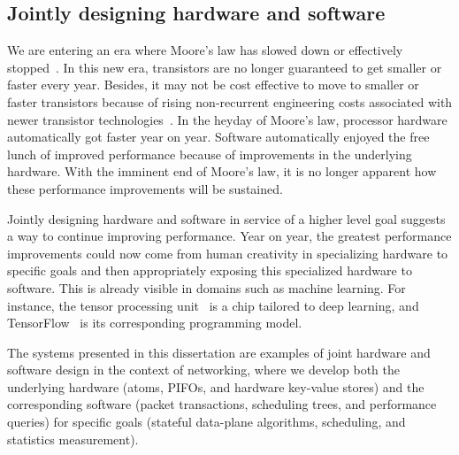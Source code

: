 \subsection{Jointly designing hardware and software} We are entering an era
where Moore's law has slowed down or effectively stopped~\cite{dark_silicon,
four_horsemen}.  In this new era, transistors are no longer guaranteed to get
smaller or faster every year. Besides, it may not be cost effective to move to
smaller or faster transistors because of rising non-recurrent engineering costs
associated with newer transistor technologies~\cite{nre_moonwalk}. In the
heyday of Moore's law, processor hardware automatically got faster year on
year. Software automatically enjoyed the free lunch of improved performance
because of improvements in the underlying hardware. With the imminent end of
Moore's law, it is no longer apparent how these performance improvements will
be sustained.

Jointly designing hardware and software in service of a higher level goal
suggests a way to continue improving performance. Year on year, the greatest
performance improvements could now come from human creativity in specializing
hardware to specific goals and then appropriately exposing this specialized
hardware to software. This is already visible in domains such as machine
learning. For instance, the tensor processing unit~\cite{tpu} is a chip
tailored to deep learning, and TensorFlow~\cite{tensorflow} is its
corresponding programming model.

The systems presented in this dissertation are examples of joint hardware and
software design in the context of networking, where we develop both the
underlying hardware (atoms, PIFOs, and hardware key-value stores) and the
corresponding software (packet transactions, scheduling trees, and performance
queries) for specific goals (stateful data-plane algorithms, scheduling, and
statistics measurement).

